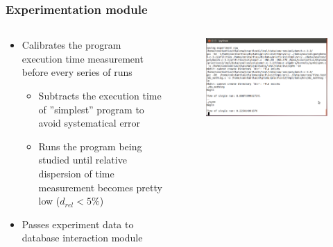 \documentclass{beamer}
\begin{document}
\begin{frame}
\frametitle{Experimentation module}

	\begin{columns}[T]
		\begin{column}{0.5\textwidth}
			\begin{itemize}
				\item Calibrates the program execution time measurement before every series of runs
				\begin{itemize}
					\item Subtracts the execution time of ''simplest'' program to avoid systematical error
					\item Runs the program being studied until relative  dispersion of time measurement becomes pretty low ($d_{rel} < 5\%$)
				\end{itemize}
				\item Passes experiment data to database interaction module
			\end{itemize}
		\end{column}
		\begin{column}{0.5\textwidth}
			\begin{figure}
				\includegraphics[width=\textwidth]{console}
			\end{figure}
		\end{column}
	\end{columns}
	
\end{frame}
\end{document}
